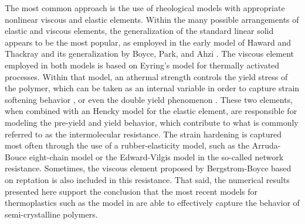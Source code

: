 The most common approach is the use of rheological models with appropriate nonlinear viscous and elastic elements.
Within the many possible arrangements of elastic and viscous elements, the generalization of the standard linear solid appears to be the most popular, as employed in the early model of Haward and Thackray \citep{hawardUseMathematicalModel1968} and its generalization by Boyce, Park, and Ahzi \citep{boyceLargeInelasticDeformation1988}.
The viscous element employed in both models is based on Eyring's model for thermally activated processes.
Within that model, an athermal strength controls the yield stress of the polymer, which can be taken as an internal variable in order to capture strain softening behavior \citep{boyceLargeInelasticDeformation1988}, or even the double yield phenomenon \citep{haoUnifiedAmorphousCrystalline2022}.
These two elements, when combined with an Hencky model for the elastic element, are responsible for modeling the pre-yield and yield behavior, which contribute to what is commonly referred to as the intermolecular resistance.
The strain hardening is captured most often through the use of a rubber-elasticity model, such as the Arruda-Bouce eight-chain model \citep{arrudaEffectsStrainRate1995} or the Edward-Vilgis model \citep{edwardsEffectEntanglementsRubber1986} in the so-called network resistance.
Sometimes, the viscous element proposed by Bergstrom-Boyce based on reptation \citep{bergstromConstitutiveModelingLarge1998, bergstromConstitutiveModelingTimedependent2001} is also included in this resistance.
That said, the numerical results presented here support the conclusion that the most recent models for thermoplastics such as the model in \cite{haoUnifiedAmorphousCrystalline2022} are able to effectively capture the behavior of semi-crystalline polymers.

